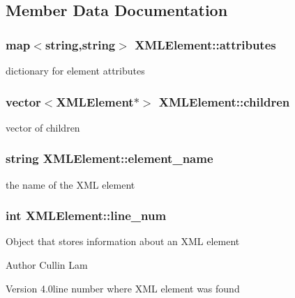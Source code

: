 \subsection{Member Data Documentation}
\hypertarget{class_x_m_l_element_a75826668ddbc8d736c375e161b25eaee}{}
\subsubsection[{attributes}]{\setlength{\rightskip}{0pt plus 5cm}map$<$string,string$>$ X\+M\+L\+Element\+::attributes\hspace{0.3cm}{\ttfamily [private]}}\label{class_x_m_l_element_a75826668ddbc8d736c375e161b25eaee}
dictionary for element attributes \hypertarget{class_x_m_l_element_a3b22b2f718295200364d0f178a97eec4}{}
\subsubsection[{children}]{\setlength{\rightskip}{0pt plus 5cm}vector$<${\bf X\+M\+L\+Element}$\ast$$>$ X\+M\+L\+Element\+::children\hspace{0.3cm}{\ttfamily [private]}}\label{class_x_m_l_element_a3b22b2f718295200364d0f178a97eec4}
vector of children \hypertarget{class_x_m_l_element_a722f30863988660ebb15ed33be03ac56}{}
\subsubsection[{element\+\_\+name}]{\setlength{\rightskip}{0pt plus 5cm}string X\+M\+L\+Element\+::element\+\_\+name\hspace{0.3cm}{\ttfamily [private]}}\label{class_x_m_l_element_a722f30863988660ebb15ed33be03ac56}
the name of the X\+M\+L element \hypertarget{class_x_m_l_element_a54da22f991a728bae20540dc00ee7778}{}
\subsubsection[{line\+\_\+num}]{\setlength{\rightskip}{0pt plus 5cm}int X\+M\+L\+Element\+::line\+\_\+num\hspace{0.3cm}{\ttfamily [private]}}\label{class_x_m_l_element_a54da22f991a728bae20540dc00ee7778}
Object that stores information about an X\+M\+L element \begin{DoxyAuthor}{Author}
Cullin Lam 
\end{DoxyAuthor}
\begin{DoxyVersion}{Version}
4.\+0line number where X\+M\+L element was found 
\end{DoxyVersion}
\hypertarget{class_x_m_l_element_a2d4e27f50c33a8faa5f825199e921475}{}
